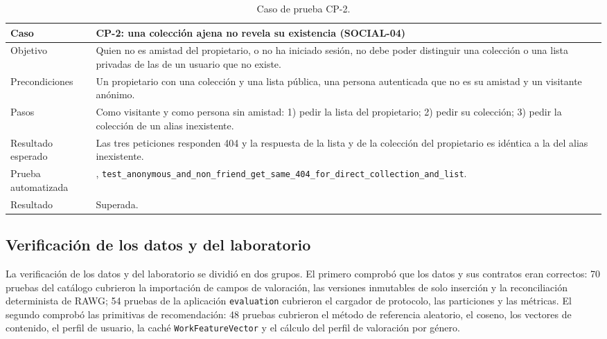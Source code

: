 \begin{table}[htp]
\centering
\small
\begin{tabularx}{\textwidth}{ | L{0.22\textwidth} | Y | }
    \hline
    \textbf{Caso} & \textbf{CP-2: una colección ajena no revela su existencia (SOCIAL-04)} \\
    \hline
    Objetivo & Quien no es amistad del propietario, o no ha iniciado sesión, no debe poder distinguir una colección o una lista privadas de las de un usuario que no existe. \\
    \hline
    Precondiciones & Un propietario con una colección y una lista pública, una persona autenticada que no es su amistad y un visitante anónimo. \\
    \hline
    Pasos & Como visitante y como persona sin amistad: 1) pedir la lista del propietario; 2) pedir su colección; 3) pedir la colección de un alias inexistente. \\
    \hline
    Resultado esperado & Las tres peticiones responden 404 y la respuesta de la lista y de la colección del propietario es idéntica a la del alias inexistente. \\
    \hline
    Prueba automatizada & , \texttt{test\_\allowbreak{}anonymous\_\allowbreak{}and\_\allowbreak{}non\_\allowbreak{}friend\_\allowbreak{}get\_\allowbreak{}same\_\allowbreak{}404\_\allowbreak{}for\_\allowbreak{}direct\_\allowbreak{}collection\_\allowbreak{}and\_\allowbreak{}list}. \\
    \hline
    Resultado & Superada. \\
    \hline
\end{tabularx}
\caption{Caso de prueba CP-2.}
\label{tab:pru-cp2}
\end{table}

\subsection{Verificación de los datos y del laboratorio}\label{sec:pru-datos}

La verificación de los datos y del laboratorio se dividió en dos grupos. El primero comprobó que los datos y
sus contratos eran correctos: 70 pruebas del catálogo cubrieron la importación de campos de
valoración, las versiones inmutables de solo inserción y la reconciliación determinista de RAWG; 54 pruebas de
la aplicación \texttt{evaluation} cubrieron el cargador de protocolo, las particiones y las
métricas. El segundo comprobó las primitivas de recomendación: 48 pruebas cubrieron el
método de referencia aleatorio, el coseno, los vectores de contenido, el perfil de usuario, la caché
\texttt{WorkFeatureVector} y el cálculo del perfil de valoración por género.


